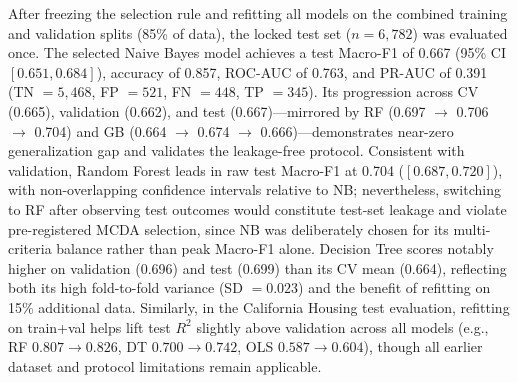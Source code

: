 After freezing the selection rule and refitting all models on the combined training and validation splits (85\% of data), the locked test set ($n = 6{,}782$) was evaluated once. The selected Naive Bayes model achieves a test Macro-F1 of 0.667 (95\% CI $[0.651, 0.684]$), accuracy of 0.857, ROC-AUC of 0.763, and PR-AUC of 0.391 (TN $= 5{,}468$, FP $= 521$, FN $= 448$, TP $= 345$). Its progression across CV (0.665), validation (0.662), and test (0.667)---mirrored by RF (0.697 $\to$ 0.706 $\to$ 0.704) and GB (0.664 $\to$ 0.674 $\to$ 0.666)---demonstrates near-zero generalization gap and validates the leakage-free protocol. Consistent with validation, Random Forest leads in raw test Macro-F1 at 0.704 ($[0.687, 0.720]$), with non-overlapping confidence intervals relative to NB; nevertheless, switching to RF after observing test outcomes would constitute test-set leakage and violate pre-registered MCDA selection, since NB was deliberately chosen for its multi-criteria balance rather than peak Macro-F1 alone. Decision Tree scores notably higher on validation (0.696) and test (0.699) than its CV mean (0.664), reflecting both its high fold-to-fold variance (SD $= 0.023$) and the benefit of refitting on 15\% additional data. Similarly, in the California Housing test evaluation, refitting on train+val helps lift test $R^2$ slightly above validation across all models (e.g., RF $0.807 \to 0.826$, DT $0.700 \to 0.742$, OLS $0.587 \to 0.604$), though all earlier dataset and protocol limitations remain applicable.
